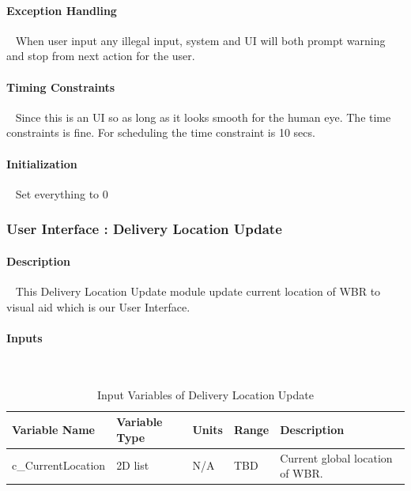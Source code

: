 \documentclass[12pt]{article}
\begin{document}
            \paragraph{Exception Handling}
            ~\newline
            When user input any illegal input, system and UI will both prompt warning and stop from next action for the user. \\ 
            
            \paragraph{Timing Constraints}
            ~\newline
            Since this is an UI so as long as it looks smooth for the human eye. The time constraints is fine. For scheduling the time constraint is 10 secs. \\
            
            \paragraph{Initialization}
            ~\newline
            Set everything to 0 \\
            
        \subsubsection{User Interface : Delivery Location Update}
            \paragraph{Description}
            ~\newline
            This Delivery Location Update module update current location of WBR to visual aid which is our User Interface. 
            \paragraph{Inputs}
            ~\newline
                \begin{table}[H]
                  \centering
                    \caption{Input Variables of Delivery Location Update} 
                    \label{tbl:Input Variables of Delivery Location Update}
                  \begin{tabularx}{\textwidth}{|p{5cm}|p{1.2cm}|p{1.2cm}|p{1cm}|X|}
                    \hline Variable Name & Variable Type & Units & Range & Description \\
                    \hline c\_CurrentLocation & 2D list &  N/A & TBD & Current global location of WBR.\\
                    \hline
                  \end{tabularx}
                \end{table} 
                
\end{document}
